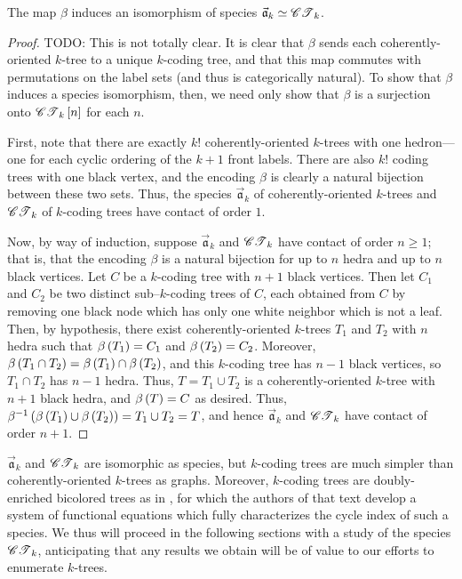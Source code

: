 \documentclass[sectionflow,singlespace,twoside,boldmathhdr,draft]{brandiss} %
\numberwithin{section}{chapter}
\numberwithin{figure}{chapter}
\begin{document}
\begin{theorem}\label{thm:bctreeenc}
  The map $\beta$ induces an isomorphism of species $\vec{\mathfrak{a}}_{k} \simeq \mathscr{CT}_{k}$.
\end{theorem}

\begin{proof}
  TODO: This is not totally clear.
  It is clear that $\beta$ sends each coherently-oriented $k$-tree to a unique $k$-coding tree, and that this map commutes with permutations on the label sets (and thus is categorically natural).
  To show that $\beta$ induces a species isomorphism, then, we need only show that $\beta$ is a surjection onto $\mathscr{CT}_{k} \left[ {n} \right]$ for each $n$.
  
  First, note that there are exactly $k!$ coherently-oriented $k$-trees with one hedron---one for each cyclic ordering of the $k+1$ front labels.
  There are also $k!$ coding trees with one black vertex, and the encoding $\beta$ is clearly a natural bijection between these two sets.
  Thus, the species $\vec{\mathfrak{a}}_{k}$ of coherently-oriented $k$-trees and $\mathscr{CT}_{k}$ of $k$-coding trees have contact of order $1$.

  Now, by way of induction, suppose $\vec{\mathfrak{a}}_{k}$ and $\mathscr{CT}_{k}$ have contact of order $n \geq 1$; that is, that the encoding $\beta$ is a natural bijection for up to $n$ hedra and up to $n$ black vertices.
  Let $C$ be a $k$-coding tree with $n+1$ black vertices.
  Then let $C_{1}$ and $C_{2}$ be two distinct sub--$k$-coding trees of $C$, each obtained from $C$ by removing one black node which has only one white neighbor which is not a leaf.
  Then, by hypothesis, there exist coherently-oriented $k$-trees $T_{1}$ and $T_{2}$ with $n$ hedra such that $\beta \left( {T_{1}} \right) = C_{1}$ and $\beta \left( {T_{2}} \right) = C_{2}$.
  Moreover, $\beta \left( {T_{1} \cap T_{2}} \right) = \beta \left( {T_{1}} \right) \cap \beta \left( {T_{2}} \right)$, and this $k$-coding tree has $n-1$ black vertices, so $T_{1} \cap T_{2}$ has $n-1$ hedra.
  Thus, $T = T_{1} \cup T_{2}$ is a coherently-oriented $k$-tree with $n+1$ black hedra, and $\beta \left( {T} \right) = C$ as desired.
  Thus, $\beta^{-1} \left( {\beta \left( {T_{1}} \right) \cup \beta \left( {T_{2}} \right)} \right) = T_{1} \cup T_{2} = T$, and hence $\vec{\mathfrak{a}}_{k}$ and $\mathscr{CT}_{k}$ have contact of order $n+1$.
\end{proof}

$\vec{\mathfrak{a}}_{k}$ and $\mathscr{CT}_{k}$ are isomorphic as species, but $k$-coding trees are much simpler than coherently-oriented $k$-trees as graphs.
Moreover, $k$-coding trees are doubly-enriched bicolored trees as in \cite[\S 3.2]{bll:species}, for which the authors of that text develop a system of functional equations which fully characterizes the cycle index of such a species.
We thus will proceed in the following sections with a study of the species $\mathscr{CT}_{k}$, anticipating that any results we obtain will be of value to our efforts to enumerate $k$-trees.
\end{document}
